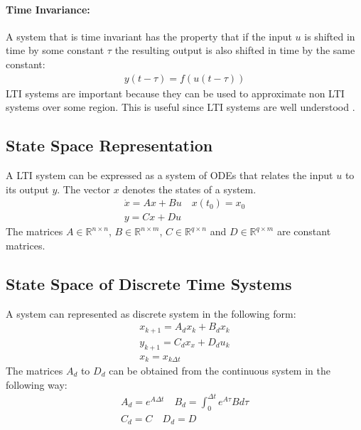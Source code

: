 \paragraph{Time Invariance:}
A system that is time invariant has the property that if the input \(u\) is shifted in time by some constant \(\tau\) the resulting output is also shifted in time by the same constant:
\begin{gather}
y(t - \tau) = f(u(t-\tau))
\end{gather}
LTI systems are important because they can be used to approximate non LTI systems over some region.
This is useful since LTI systems are well understood \cite{DouglasB}.
\subsection{State Space Representation}
A LTI system can be expressed as a system of ODEs that relates the input \(u\) to its output \(y\).
The vector \(x\) denotes the states of a system.
\begin{gather}
\dot{x} = Ax + Bu \quad x(t_0) = x_0\\
y = Cx + Du
\end{gather}
The matrices \(A \in \mathbb{R}^{n \times n}\),
\(B \in \mathbb{R}^{n \times m}\),
\(C \in \mathbb{R}^{q \times n}\) and
\(D \in \mathbb{R}^{q \times m}\) are constant matrices.
\cite{BennerGrivet}
\subsection{State Space of Discrete Time Systems}
A system can represented as discrete system in the following form:
\begin{gather}
x_{k+1} = A_dx_k + B_dx_k \label{disc-a} \\
y_{k+1} = C_dx_x + D_du_k \label{disc-b}\\
x_{k} = x_{k\Delta t}
\end{gather}
The matrices \(A_d\) to \(D_d\) can be obtained from the continuous system in the following way:
\begin{gather}
A_d = e^{A\Delta t} \quad B_d = \int_0^{\Delta t} e^{A\tau}B d\tau \\
C_d = C \quad D_d = D
\end{gather}
\cite{brunton_kutz_2019g}
